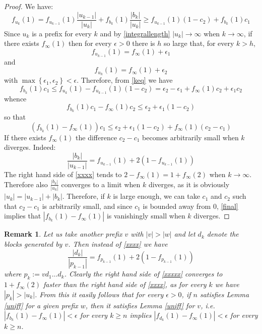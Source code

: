 \documentclass[10pt,a4paper]{article}
\newtheorem{rem}{Remark}
\begin{document}
\begin{proof}
We have:
\begin{equation}
f_{u_k}(1)=f_{u_{k-1}}(1) \frac{|u_{k-1}|}{|u_k|}+f_{b_k}(1)\frac{|b_k|}{|u_k|}\ge f_{u_{k-1}}(1) (1-c_2)+f_{b_k}(1)c_1
\label{keq}
\end{equation}
Since $u_k$ is a prefix for every $k$ and by \eqref{integrallength} $|u_k|\rightarrow \infty$ when $k\rightarrow\infty$, if there exists $f_{\infty}(1)$ then for every $\epsilon>0$ there is $h$ so large that, for every $k>h$,
$$f_{u_{k-1}}(1)=f_{\infty}(1)+{\epsilon}_1$$
and
$$f_{u_{k}}(1)=f_{\infty}(1)+{\epsilon}_2$$
with $\max\left\lbrace\epsilon_1,\epsilon_2\right\rbrace<\epsilon$. Therefore, from \eqref{keq} we have
\begin{equation*}
f_{b_k}(1)c_1\le f_{u_k}(1)-f_{u_{k-1}}(1) (1-c_2)=\epsilon_2-\epsilon_1+f_{\infty}(1)c_2+\epsilon_1 c_2
\end{equation*}
whence
\begin{equation*}
f_{b_k}(1)c_1-f_{\infty}(1)c_2\le \epsilon_2+\epsilon_1(1-c_2)
\end{equation*}
so that
\begin{equation}
\left( f_{b_k}(1)-f_{\infty}(1) \right)c_1\le \epsilon_2+\epsilon_1(1-c_2)+f_{\infty}(1)(c_2-c_1)
\label{final}
\end{equation}
If there exists $f_{\infty}(1)$ the difference $c_2-c_1$ becomes arbitrarily small when $k$ diverges. Indeed:
\begin{equation}
\frac{|b_k|}{|u_{k-1}|}=f_{u_{k-1}}(1)+2\left(1-f_{u_{k-1}}(1)\right)
\label{xxxx}
\end{equation}
The right hand side of \eqref{xxxx} tends to $2-f_{\infty}(1)=1+f_{\infty}(2)$ when $k\rightarrow \infty$. Therefore also $\frac{|b_k|}{|u_k|}$ converges to a limit when $k$ diverges, as it is obviously $|u_k|=|u_{k-1}|+|b_k|$. Therefore, if $k$ is large enough, we can take $c_1$ and $c_2$ such that $c_2-c_1$ is arbitrarily small, and since $c_1$ is bounded away from 0, \eqref{final} implies that $|f_{b_k}(1)-f_{\infty}(1)|$ is vanishingly small when $k$ diverges.
\end{proof}
\begin{rem}
Let us take another prefix $v$ with $|v|>|w|$ and let $d_k$ denote the blocks generated by $v$. Then instead of \eqref{xxxx} we have
\begin{equation}
\frac{|d_k|}{|p_{k-1}|}=f_{p_{k-1}}(1)+2\left(1-f_{p_{k-1}}(1)\right)
\label{xxxxx}
\end{equation}
where $p_k:=vd_1\dots d_k$. Clearly the right hand side of \eqref{xxxxx} converges to $1+f_{\infty}(2)$ faster than the right hand side of \eqref{xxxx}, as for every $k$ we have $|p_k|>|u_k|$. From this it easily follows that for every $\epsilon>0$, if $n$ satisfies Lemma \ref{uniff} for a given prefix $w$, then it satisfies Lemma \ref{uniff} for $v$, i.e. $|f_{b_k}(1)-f_{\infty}(1)|<\epsilon$ for every $k\ge n$ implies $|f_{d_k}(1)-f_{\infty}(1)|<\epsilon$ for every $k\ge n$. 
\label{remblockpref}  
\end{rem}
\end{document}
